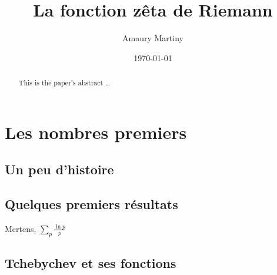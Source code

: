 \documentclass[french]{report}
\title{La fonction zêta de Riemann}
\author{Amaury Martiny}
\date{\today}
\begin{document}
\maketitle

\begin{abstract}
  This is the paper's abstract \ldots
  \end{abstract}

\tableofcontents{}

\chapter{Les nombres premiers}

\section{Un peu d'histoire}

\section{Quelques premiers résultats}

Mertens, $\sum_p\frac{\ln p}{p}$

\section{Tchebychev et ses fonctions}
\end{document}
